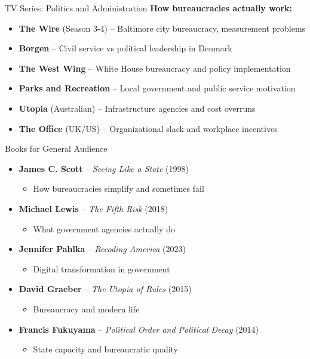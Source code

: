 \documentclass[10pt]{beamer}
\begin{document}
\begin{frame}{TV Series: Politics and Administration}
\textbf{How bureaucracies actually work:}
\begin{itemize}
\item \textbf{The Wire} (Season 3-4) – Baltimore city bureaucracy, measurement problems
\item \textbf{Borgen} – Civil service vs political leadership in Denmark
\item \textbf{The West Wing} – White House bureaucracy and policy implementation
\item \textbf{Parks and Recreation} – Local government and public service motivation
\item \textbf{Utopia} (Australian) – Infrastructure agencies and cost overruns
\item \textbf{The Office} (UK/US) – Organizational slack and workplace incentives
\end{itemize}
\end{frame}

\begin{frame}{Books for General Audience}
\begin{itemize}
\item \textbf{James C. Scott} – \emph{Seeing Like a State} (1998)
\begin{itemize}
\item How bureaucracies simplify and sometimes fail
\end{itemize}
\item \textbf{Michael Lewis} – \emph{The Fifth Risk} (2018)
\begin{itemize}
\item What government agencies actually do
\end{itemize}
\item \textbf{Jennifer Pahlka} – \emph{Recoding America} (2023)
\begin{itemize}
\item Digital transformation in government
\end{itemize}
\item \textbf{David Graeber} – \emph{The Utopia of Rules} (2015)
\begin{itemize}
\item Bureaucracy and modern life
\end{itemize}
\item \textbf{Francis Fukuyama} – \emph{Political Order and Political Decay} (2014)
\begin{itemize}
\item State capacity and bureaucratic quality
\end{itemize}
\end{itemize}
\end{frame}
\end{document}
